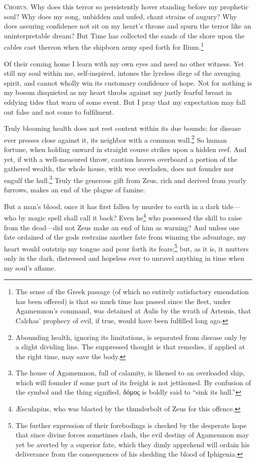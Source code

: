 \documentclass[12pt]{article}
\begin{document}
\textsc{Chorus.} Why does this terror so persistently hover standing before my prophetic soul? Why does my song, unbidden and unfed, chant strains of augury? Why does assuring confidence not sit on my heart's throne and spurn the terror like an uninterpretable dream? But Time has collected the sands of the shore upon the cables cast thereon when the shipborn army sped forth for Ilium.\footnote{The sense of the Greek passage (of which no entirely satisfactory emendation has been offered) is that so much time has passed since the fleet, under Agamemnon's command, was detained at Aulis by the wrath of Artemis, that Calchas' prophecy of evil, if true, would have been fulfilled long ago.}

Of their coming home I learn with my own eyes and need no other witness. Yet still my soul within me, self-inspired, intones the lyreless dirge of the avenging spirit, and cannot wholly win its customary confidence of hope. Not for nothing is my bosom disquieted as my heart throbs against my justly fearful breast in eddying tides that warn of some event. But I pray that my expectation may fall out false and not come to fulfilment.

Truly blooming health does not rest content within its due bounds; for disease ever presses close against it, its neighbor with a common wall.\footnote{Abounding health, ignoring its limitations, is separated from disease only by a slight dividing line. The suppressed thought is that remedies, if applied at the right time, may save the body.} So human fortune, when holding onward in straight course strikes upon a hidden reef. And yet, if with a well-measured throw, caution heaves overboard a portion of the gathered wealth, the whole house, with woe overladen, does not founder nor engulf the hull.\footnote{The house of Agamemnon, full of calamity, is likened to an overloaded ship, which will founder if some part of its freight is not jettisoned. By confusion of the symbol and the thing signified, δόμος is boldly said to ``sink its hull.''} Truly the generous gift from Zeus, rich and derived from yearly furrows, makes an end of the plague of famine.

But a man's blood, once it has first fallen by murder to earth in a dark tide---who by magic spell shall call it back? Even he\footnote{{\AE}sculapius, who was blasted by the thunderbolt of Zeus for this offence.} who possessed the skill to raise from the dead---did not Zeus make an end of him as warning? And unless one fate ordained of the gods restrains another fate from winning the advantage, my heart would outstrip my tongue and pour forth its fears;\footnote{The further expression of their forebodings is checked by the desperate hope that since divine forces sometimes clash, the evil destiny of Agamemnon may yet be averted by a superior fate, which they dimly apprehend will ordain his deliverance from the consequences of his shedding the blood of Iphigenia.} but, as it is, it mutters only in the dark, distressed and hopeless ever to unravel anything in time when my soul's aflame.
\end{document}
